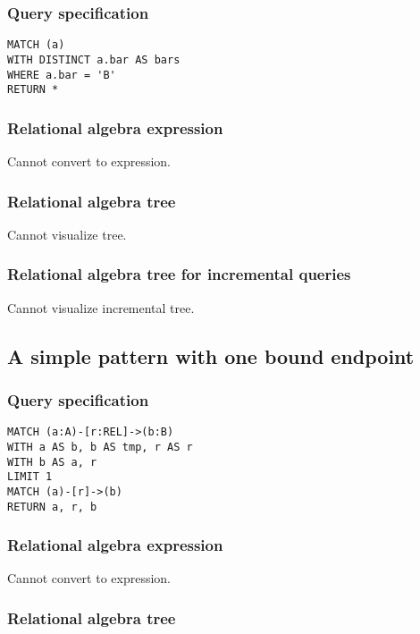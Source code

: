 \subsubsection*{Query specification}

\begin{lstlisting}
MATCH (a)
WITH DISTINCT a.bar AS bars
WHERE a.bar = 'B'
RETURN *
\end{lstlisting}

\subsubsection*{Relational algebra expression}

Cannot convert to expression.

\subsubsection*{Relational algebra tree}

Cannot visualize tree.

\subsubsection*{Relational algebra tree for incremental queries}

Cannot visualize incremental tree.

\subsection{A simple pattern with one bound endpoint}

\subsubsection*{Query specification}

\begin{lstlisting}
MATCH (a:A)-[r:REL]->(b:B)
WITH a AS b, b AS tmp, r AS r
WITH b AS a, r
LIMIT 1
MATCH (a)-[r]->(b)
RETURN a, r, b
\end{lstlisting}

\subsubsection*{Relational algebra expression}

Cannot convert to expression.

\subsubsection*{Relational algebra tree}

